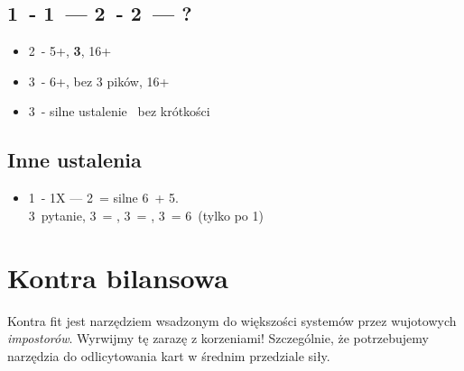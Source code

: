 \documentclass[12pt, a4paper]{article}
\begin{document}
\subsection{1\hearts\ - 1\spades\ --- 2\clubs\ - 2\diams\ --- ?}
\begin{itemize}
    \item 2\spades\ - 5+\hearts, \textbf{3\spades}, 16+
    \item 3\hearts\ - 6+\hearts, bez 3 pików, 16+
    \item 3\spades\ - silne ustalenie \spades\ bez krótkości
\end{itemize}

\subsection{Inne ustalenia}
\begin{itemize}
    \item 1\major\ - 1X --- 2\nt\ = silne 6\major\ + 5\minor. \\ 3\clubs\ pytanie, 
    3\diams\ = \clubs, 3\hearts\ = \diams, 3\spades\ = 6\hearts\ (tylko po 1\spades)
\end{itemize}




\pagebreak
\section{Kontra bilansowa}
Kontra fit jest narzędziem wsadzonym do większości systemów przez wujotowych \emph{impostorów}. Wyrwijmy tę zarazę z korzeniami!
Szczególnie, że potrzebujemy narzędzia do odlicytowania kart w średnim przedziale siły.
\end{document}
